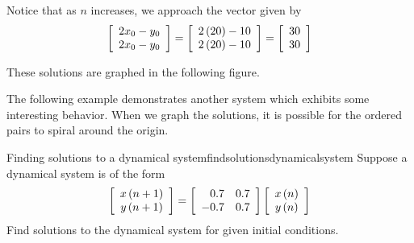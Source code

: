\begin{solution}
Notice that as $n$ increases, we approach the vector given by  
\begin{equation*}
\left[
\begin{array}{c}
2x_{0}-y_{0} \\
2x_{0}-y_{0}
\end{array}
\right]
=
\left[
\begin{array}{r}
2\left(20\right)- 10\\
2\left( 20 \right)-10
\end{array}
\right]
=
\left[
\begin{array}{r}
30\\
30
\end{array}
\right]
\end{equation*}

These solutions are graphed in the following figure. 

\begin{center}
\end{center}

\end{solution}

The following example demonstrates another system which exhibits some interesting behavior. When we graph 
the solutions, it is
possible for the ordered pairs to spiral around the origin.

\begin{example}{Finding solutions to a dynamical system}{findsolutionsdynamicalsystem}
Suppose a dynamical system is of the form
\begin{equation*}
\left[
\begin{array}{c}
x\left( n+1\right) \\
y\left( n+1\right)
\end{array}
\right] =\left[ 
\begin{array}{rr}
0.7 & 0.7 \\
-0.7 & 0.7
\end{array}
\right] \left[
\begin{array}{c}
x\left( n\right) \\
y\left( n\right)
\end{array}
\right]
\end{equation*}
Find solutions to the dynamical system for given initial conditions.
\end{example}

